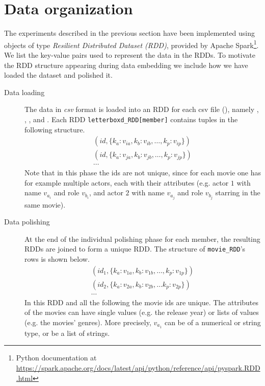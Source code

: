 \section{Data organization}\label{experiments_dataOrganization}
The experiments described in the previous section have been implemented using objects of type \textit{Resilient Distributed Dataset (RDD)}, provided by Apache Spark\footnote{Python documentation at \url{https://spark.apache.org/docs/latest/api/python/reference/api/pyspark.RDD.html}}. We list the key-value pairs used to represent the data in the RDDs. To motivate the RDD structure appearing during data embedding we include how we have loaded the dataset and polished it.
\begin{description}
    \item [Data loading] The data in \textit{csv} format is loaded into an RDD for each csv file (), namely , , ,  and . Each RDD \texttt{letterboxd\_RDD[member]} contains tuples in the following structure.
        $$\begin{array}{c}
            (id, \{k_a: v_{ia}, k_b: v_{ib}, \dots, k_p: v_{ip}\})\\
            (id, \{k_a: v_{ja}, k_b: v_{jb}, \dots, k_p: v_{jp}\})\\
            \cdots
        \end{array}$$
    Note that in this phase the ids are not unique, since for each movie one has for example multiple actors, each with their attributes (e.g. actor $1$ with name $v_{a_i}$ and role $v_{b_i}$, and actor $2$ with name $v_{a_j}$ and role $v_{b_j}$ starring in the same movie).

    \item [Data polishing] At the end of the individual polishing phase for each member, the resulting RDDs are joined to form a unique RDD. The structure of \texttt{movie\_RDD}'s rows is shown below.
        $$\begin{array}{c}
            (id_1, \{k_a: v_{1a}, k_b: v_{1b}, \dots, k_p: v_{1p}\})\\
            (id_2, \{k_a: v_{2a}, k_b: v_{2b}, \dots k_p: v_{2p}\})\\
            \cdots
        \end{array}$$
    In this RDD and all the following the movie ids are unique. The attributes of the movies can have single values (e.g. the release year) or lists of values (e.g. the movies' genres). More precisely, $v_{a_1}$ can be of a numerical or string type, or be a list of strings.


\end{description}
